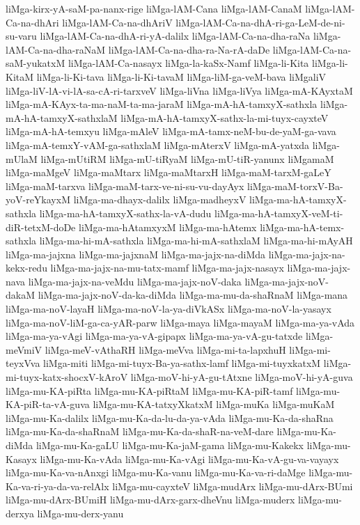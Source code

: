 {liMga-kirx-yA-saM-pa-nanx-rige
liMga-lAM-Cana
liMga-lAM-CanaM
liMga-lAM-Ca-na-dhAri
liMga-lAM-Ca-na-dhAriV
liMga-lAM-Ca-na-dhA-ri-ga-LeM-de-ni-su-varu
liMga-lAM-Ca-na-dhA-ri-yA-dalilx
liMga-lAM-Ca-na-dha-raNa
liMga-lAM-Ca-na-dha-raNaM
liMga-lAM-Ca-na-dha-ra-Na-rA-daDe
liMga-lAM-Ca-na-saM-yukatxM
liMga-lAM-Ca-nasayx
liMga-la-kaSx-Namf
liMga-li-Kita
liMga-li-KitaM
liMga-li-Ki-tava
liMga-li-Ki-tavaM
liMga-liM-ga-veM-bava
liMgaliV
liMga-liV-lA-vi-lA-sa-cA-ri-tarxveV
liMga-liVna
liMga-liVya
liMga-mA-KAyxtaM
liMga-mA-KAyx-ta-ma-naM-ta-ma-jaraM
liMga-mA-hA-tamxyX-sathxla
liMga-mA-hA-tamxyX-sathxlaM
liMga-mA-hA-tamxyX-sathx-la-mi-tuyx-cayxteV
liMga-mA-hA-temxyu
liMga-mAleV
liMga-mA-tamx-neM-bu-de-yaM-ga-vava
liMga-mA-temxY-vAM-ga-sathxlaM
liMga-mAterxV
liMga-mA-yatxda
liMga-mUlaM
liMga-mUtiRM
liMga-mU-tiRyaM
liMga-mU-tiR-yanunx
liMgamaM
liMga-maMgeV
liMga-maMtarx
liMga-maMtarxH
liMga-maM-tarxM-gaLeY
liMga-maM-tarxva
liMga-maM-tarx-ve-ni-su-vu-dayAyx
liMga-maM-torxV-Ba-yoV-reYkayxM
liMga-ma-dhayx-dalilx
liMga-madheyxV
liMga-ma-hA-tamxyX-sathxla
liMga-ma-hA-tamxyX-sathx-la-vA-dudu
liMga-ma-hA-tamxyX-veM-ti-diR-tetxM-doDe
liMga-ma-hAtamxyxM
liMga-ma-hAtemx
liMga-ma-hA-temx-sathxla
liMga-ma-hi-mA-sathxla
liMga-ma-hi-mA-sathxlaM
liMga-ma-hi-mAyAH
liMga-ma-jajxna
liMga-ma-jajxnaM
liMga-ma-jajx-na-diMda
liMga-ma-jajx-na-kekx-redu
liMga-ma-jajx-na-mu-tatx-mamf
liMga-ma-jajx-nasayx
liMga-ma-jajx-nava
liMga-ma-jajx-na-veMdu
liMga-ma-jajx-noV-daka
liMga-ma-jajx-noV-dakaM
liMga-ma-jajx-noV-da-ka-diMda
liMga-ma-mu-da-shaRnaM
liMga-mana
liMga-ma-noV-layaH
liMga-ma-noV-la-ya-diVkASx
liMga-ma-noV-la-yasayx
liMga-ma-noV-liM-ga-ca-yAR-parw
liMga-maya
liMga-mayaM
liMga-ma-ya-vAda
liMga-ma-ya-vAgi
liMga-ma-ya-vA-gipapx
liMga-ma-ya-vA-gu-tatxde
liMga-meVmiV
liMga-meV-vAthaRH
liMga-meVva
liMga-mi-ta-lapxhuH
liMga-mi-teyxVva
liMga-miti
liMga-mi-tuyx-Ba-ya-sathx-lamf
liMga-mi-tuyxkatxM
liMga-mi-tuyx-katx-shocxV-kAroV
liMga-moV-hi-yA-gu-tAtxne
liMga-moV-hi-yA-guva
liMga-mu-KA-piRta
liMga-mu-KA-piRtaM
liMga-mu-KA-piR-tamf
liMga-mu-KA-piR-ta-vA-guva
liMga-mu-KA-tatxyXkatxM
liMga-muKa
liMga-muKaM
liMga-mu-Ka-dalilx
liMga-mu-Ka-da-lu-da-ya-vAda
liMga-mu-Ka-da-shaRna
liMga-mu-Ka-da-shaRnaM
liMga-mu-Ka-da-shaR-na-veM-dare
liMga-mu-Ka-diMda
liMga-mu-Ka-gaLU
liMga-mu-Ka-jaM-gama
liMga-mu-Kakekx
liMga-mu-Kasayx
liMga-mu-Ka-vAda
liMga-mu-Ka-vAgi
liMga-mu-Ka-vA-gu-va-vayayx
liMga-mu-Ka-va-nAnxgi
liMga-mu-Ka-vanu
liMga-mu-Ka-va-ri-daMge
liMga-mu-Ka-va-ri-ya-da-va-relAlx
liMga-mu-cayxteV
liMga-mudArx
liMga-mu-dArx-BUmi
liMga-mu-dArx-BUmiH
liMga-mu-dArx-garx-dheVnu
liMga-muderx
liMga-mu-derxya
liMga-mu-derx-yanu
}
